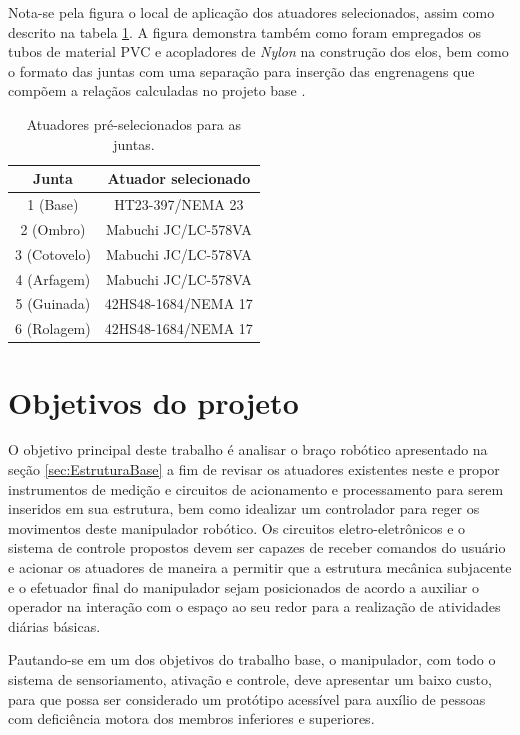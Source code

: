 Nota-se pela figura o local de aplicação dos atuadores selecionados, assim como descrito na tabela \ref{tab:AtuadoresPre}. A figura demonstra também como
foram empregados os tubos de material PVC e acopladores de \textit{Nylon} na construção dos elos, bem como o formato das juntas com uma separação para inserção
das engrenagens que compõem a relaçãos calculadas no projeto base \cite{fernando2019assistivo}.

\begin{table}[h]
\begin{centering}  

\begin{tabular}{|c|c|}
    \hline
    Junta & Atuador selecionado \tabularnewline
    \hline
    \hline
    1 (Base) & HT23-397/NEMA 23 \tabularnewline
    \hline
    2 (Ombro) & Mabuchi JC/LC-578VA \tabularnewline
    \hline
    3 (Cotovelo) & Mabuchi JC/LC-578VA \tabularnewline
    \hline
    4 (Arfagem) & Mabuchi JC/LC-578VA \tabularnewline
    \hline
    5 (Guinada) & 42HS48-1684/NEMA 17 \tabularnewline
    \hline
    6 (Rolagem) & 42HS48-1684/NEMA 17 \tabularnewline
    \hline
\end{tabular}

\caption{Atuadores pré-selecionados para as juntas.}
\label{tab:AtuadoresPre}

\par\end{centering}
\end{table}

\section{Objetivos do projeto}

O objetivo principal deste trabalho é analisar o braço robótico apresentado na seção \ref{sec:EstruturaBase} a fim de revisar os atuadores existentes neste e
propor instrumentos de medição e circuitos de acionamento e processamento para serem inseridos em sua estrutura, bem como idealizar um controlador para reger 
os movimentos deste manipulador robótico. 
Os circuitos eletro-eletrônicos e o sistema de controle propostos devem
ser capazes de receber comandos do usuário e acionar os atuadores de 
maneira a permitir que a estrutura mecânica subjacente e o efetuador 
final do manipulador sejam posicionados de acordo a auxiliar o operador 
na interação com o espaço ao seu redor para a realização de atividades
diárias básicas.

Pautando-se em um dos objetivos do trabalho base, o manipulador, com 
todo o sistema de sensoriamento, ativação e controle, deve apresentar 
um baixo custo, para que possa ser considerado um protótipo acessível
para auxílio de pessoas com deficiência motora dos membros inferiores 
e superiores.

